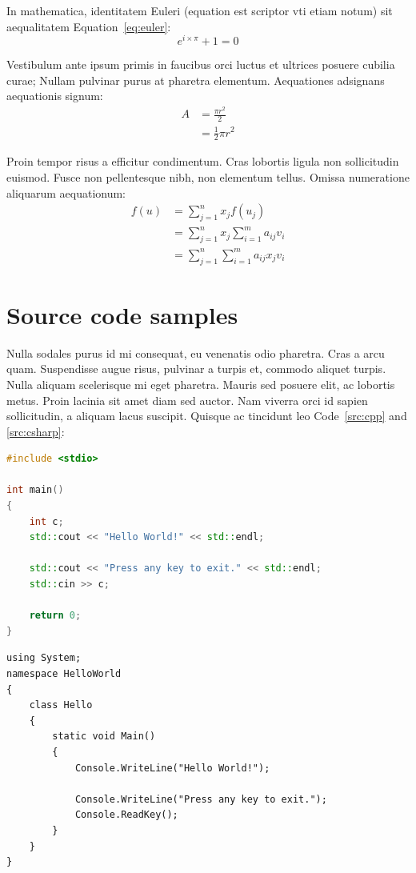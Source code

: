 In mathematica, identitatem Euleri (equation est scriptor vti etiam notum) sit aequalitatem Equation~\ref{eq:euler}:
\begin{equation}\label{eq:euler}
e^{i \times \pi} + 1 = 0
\end{equation}

Vestibulum ante ipsum primis in faucibus orci luctus et ultrices posuere cubilia curae; Nullam pulvinar purus at pharetra elementum.
Aequationes adsignans aequationis signum:
\begin{align}
	A & = \frac{\pi r^2}{2} \\
	& = \frac{1}{2} \pi r^2
\end{align}

Proin tempor risus a efficitur condimentum. Cras lobortis ligula non sollicitudin euismod. Fusce non pellentesque nibh, non elementum tellus.
Omissa numeratione aliquarum aequationum:
\begin{align}
	f(u) & =\sum_{j=1}^{n} x_jf(u_j) \nonumber \\
	& =\sum_{j=1}^{n} x_j \sum_{i=1}^{m} a_{ij}v_i \nonumber \\
	& =\sum_{j=1}^{n} \sum_{i=1}^{m} a_{ij}x_jv_i
\end{align}

\section{Source code samples}

Nulla sodales purus id mi consequat, eu venenatis odio pharetra. Cras a arcu quam. Suspendisse augue risus, pulvinar a turpis et, commodo aliquet turpis. Nulla aliquam scelerisque mi eget pharetra. Mauris sed posuere elit, ac lobortis metus. Proin lacinia sit amet diam sed auctor. Nam viverra orci id sapien sollicitudin, a aliquam lacus suscipit. Quisque ac tincidunt leo Code~\ref{src:cpp} and \ref{src:csharp}:

\begin{lstlisting}[language={C++}]
#include <stdio>

int main() 
{
	int c;
	std::cout << "Hello World!" << std::endl;

	std::cout << "Press any key to exit." << std::endl;
	std::cin >> c;
	
	return 0;
}
\end{lstlisting}

\begin{lstlisting}[language={[Sharp]C}]
using System;
namespace HelloWorld
{
	class Hello 
	{
		static void Main() 
		{
			Console.WriteLine("Hello World!");
			
			Console.WriteLine("Press any key to exit.");
			Console.ReadKey();
		}
	}
}
\end{lstlisting}

